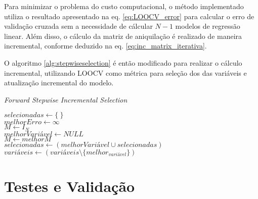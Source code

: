 Para minimizar o problema do custo computacional, o método implementado utiliza o resultado apresentado na eq. 
\ref{eq:LOOCV_error} para calcular o erro de validação cruzada sem a necessidade de cálcular $N-1$ modelos de 
regressão linear. Além disso, o cálculo da matriz de aniquilação é realizado de maneira incremental, conforme 
deduzido na eq. \ref{eq:inc_matrix_iterativa}.

O algoritmo \ref{alg:stepwiseselection} é então modificado para realizar o cálculo incremental, utilizando 
LOOCV como métrica para seleção dos das variáveis e atualização incremental do modelo.

\qquad

\begin{algorithm}[H]
    \caption{\textit{Forward Stepwise Incremental Selection}}
    
    $selecionadas \gets \{\ \}$ \\
    $melhorErro \gets \infty$ \\
    $M \gets I_N$ \\

    { 
        $melhorVariável \gets NULL$ \\
        $M \gets melhorM $ \\
        $selecionadas \gets (melhorVariável \cup selecionadas)$ \\
        $variáveis \gets (variáveis \setminus \{melhor_{variável}\})$ \\
    }
    \label{alg:incstepwiseselection}
\end{algorithm}



\section{Testes e Validação}

